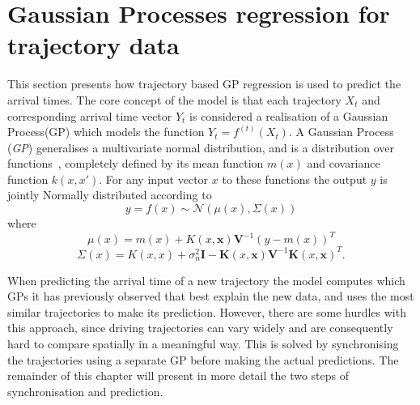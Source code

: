 \section{Gaussian Processes regression for trajectory data}
This section presents how trajectory based GP regression is used to predict the arrival times. The core concept of the model is that each trajectory $X_t$ and corresponding arrival time vector $Y_t$ is considered a realisation of a Gaussian Process(GP) which models the function $Y_t = f^{(t)}(X_t)$. A Gaussian Process (\textit{GP}) generalises a multivariate normal distribution, and is a distribution over functions~\cite{Rasmussen-Williams-2006}, completely defined by its mean function $m(x)$ and covariance function $k(x, x')$. For any input vector $x$ to these functions the output $y$ is jointly Normally distributed according to
\begin{equation}
  \label{eq:gp}
  y = f(x) \sim \mathcal{N}(\mu(x), \Sigma(x))
\end{equation}
where
\begin{equation}
  \label{eq:gp-mean-function}
  \mu(x) = m(x) + K(x, \textbf{x})\textbf{V}^{-1}{(y-m(x))}^{T}
\end{equation}
\begin{equation}
  \label{eq:gp-covariance-function}
  \Sigma(x) = K(x, x) + \sigma^{2}_n\textbf{I} - \textbf{K}(x, \textbf{x})\textbf{V}^{-1}{\textbf{K}(x, \textbf{x})}^{T}.
\end{equation}

When predicting the arrival time of a new trajectory the model computes which GPs it has previously observed that best explain the new data, and uses the most similar trajectories to make its prediction. However, there are some hurdles with this approach, since driving trajectories can vary widely and are consequently hard to compare spatially in a meaningful way. This is solved by synchronising the trajectories using a separate GP before making the actual predictions. The remainder of this chapter will present in more detail the two steps of synchronisation and prediction.

